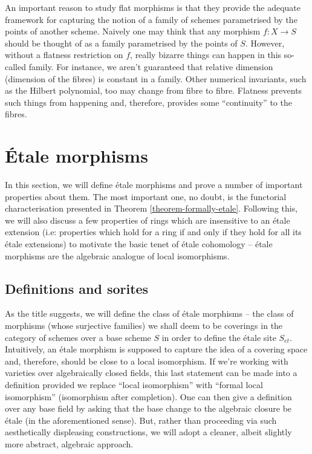 \noindent
An important reason to study flat morphisms is that they provide the adequate
framework for capturing the notion of a family of schemes parametrised by the
points of another scheme. Naively one may think that any morphism $f:X \to S$
should be thought of as a family parametrised by the points of $S$. However,
without a flatness restriction on $f$, really bizarre things can happen in
this so-called family. For instance, we aren't guaranteed that relative
dimension (dimension of the fibres) is constant in a family. Other numerical
invariants, such as the Hilbert polynomial, too may change from fibre to
fibre. Flatness prevents such things from happening and, therefore, provides
some ``continuity'' to the fibres. 

\section{\'Etale morphisms}
\label{section-etale-moprhisms}

\noindent
In this section, we will define \'etale morphisms and prove a number of
important properties about them. The most important one, no doubt, is the
functorial characterisation presented in Theorem \ref{theorem-formally-etale}.
Following this, we will also discuss a few properties of rings which are
insensitive to an \'etale extension (i.e: properties which hold for a ring
if and only if they hold for all its \'etale extensions) to motivate the basic
tenet of \'etale cohomology -- \'etale morphisms are the algebraic analogue of
local isomorphisms.

\subsection{Definitions and sorites}
\label{subsection-etale-definition}

\noindent
As the title suggests, we will define the class of \'etale morphisms -- the
class of morphisms (whose surjective families) we shall deem to be coverings
in the category of schemes over a base scheme $S$ in order to define the
\'etale site $S_{et}$. Intuitively, an \'etale morphism is supposed to
capture the idea of a covering space and, therefore, should be close to a
local isomorphism. If we're working with varieties over algebraically closed
fields, this last statement can be made into a definition provided we replace
``local isomorphism'' with ``formal local isomorphism'' (isomorphism after
completion). One can then give a definition over any base field by asking
that the base change to the algebraic closure be \'etale (in the
aforementioned sense). But, rather than proceeding via such aesthetically
displeasing constructions, we will adopt a cleaner, albeit slightly more
abstract, algebraic approach.


